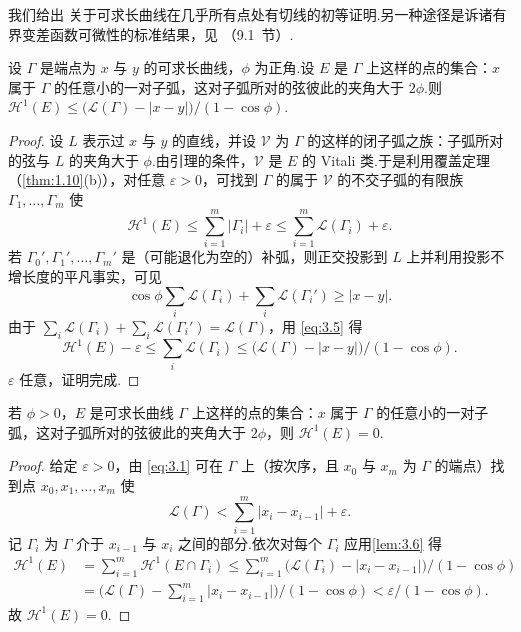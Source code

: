 我们给出 \textcite{besicovitch1944} 关于可求长曲线在几乎所有点处有切线的初等证明.另一种途径是诉诸有界变差函数可微性的标准结果，见 \textcite{kingmantaylor1966}（9.1~节）.

\begin{lemma}\label{lem:3.6}
设 $\Gamma$ 是端点为 $x$ 与 $y$ 的可求长曲线，$\phi$ 为正角.设 $E$ 是 $\Gamma$ 上这样的点的集合：$x$ 属于 $\Gamma$ 的任意小的一对子弧，这对子弧所对的弦彼此的夹角大于 $2\phi$.则 $\mathcal{H}^1(E)\leq\bigl(\mathscr{L}(\Gamma)-|x-y|\bigr)/(1-\cos\phi)$.
\end{lemma}

\begin{proof}
设 $L$ 表示过 $x$ 与 $y$ 的直线，并设 $\mathcal{V}$ 为 $\Gamma$ 的这样的闭子弧之族：子弧所对的弦与 $L$ 的夹角大于 $\phi$.由引理的条件，$\mathcal{V}$ 是 $E$ 的 Vitali 类.于是利用覆盖定理（\cref{thm:1.10}(b)），对任意 $\varepsilon>0$，可找到 $\Gamma$ 的属于 $\mathcal{V}$ 的不交子弧的有限族 $\Gamma_1,\ldots,\Gamma_m$ 使
\begin{equation}\label{eq:3.5}
  \mathcal{H}^{1}(E)\leq\sum_{i=1}^{m}|\Gamma_i|+\varepsilon\leq\sum_{i=1}^{m}\mathscr{L}(\Gamma_i)+\varepsilon.
\end{equation}
若 $\Gamma_0',\Gamma_1',\ldots,\Gamma_m'$ 是（可能退化为空的）补弧，则正交投影到 $L$ 上并利用投影不增长度的平凡事实，可见
\[
  \cos\phi\sum_{i}\mathscr{L}(\Gamma_i)+\sum_{i}\mathscr{L}(\Gamma_i')\geq|x-y|.
\]
由于 $\sum_{i}\mathscr{L}(\Gamma_i)+\sum_{i}\mathscr{L}(\Gamma_i')=\mathscr{L}(\Gamma)$，用 \eqref{eq:3.5} 得
\[
  \mathcal{H}^{1}(E)-\varepsilon\leq\sum_{i}\mathscr{L}(\Gamma_i)\leq\bigl(\mathscr{L}(\Gamma)-|x-y|\bigr)/(1-\cos\phi).
\]
$\varepsilon$ 任意，证明完成.
\end{proof}

\begin{corollary}\label{cor:3.7}
若 $\phi>0$，$E$ 是可求长曲线 $\Gamma$ 上这样的点的集合：$x$ 属于 $\Gamma$ 的任意小的一对子弧，这对子弧所对的弦彼此的夹角大于 $2\phi$，则 $\mathcal{H}^1(E)=0$.
\end{corollary}

\begin{proof}
给定 $\varepsilon>0$，由 \eqref{eq:3.1} 可在 $\Gamma$ 上（按次序，且 $x_0$ 与 $x_m$ 为 $\Gamma$ 的端点）找到点 $x_0,x_1,\ldots,x_m$ 使
\[
  \mathscr{L}(\Gamma)<\sum_{i=1}^{m}|x_i-x_{i-1}|+\varepsilon.
\]
记 $\Gamma_i$ 为 $\Gamma$ 介于 $x_{i-1}$ 与 $x_i$ 之间的部分.依次对每个 $\Gamma_i$ 应用\cref{lem:3.6} 得
\begin{align*}
  \mathcal{H}^{1}(E)
  &=\sum_{i=1}^{m}\mathcal{H}^{1}(E\cap\Gamma_i)
  \leq\sum_{i=1}^{m}\bigl(\mathscr{L}(\Gamma_i)-|x_i-x_{i-1}|\bigr)/(1-\cos\phi)\\
  &=\bigl(\mathscr{L}(\Gamma)-\sum_{i=1}^{m}|x_i-x_{i-1}|\bigr)/(1-\cos\phi)
  <\varepsilon/(1-\cos\phi).
\end{align*}
故 $\mathcal{H}^1(E)=0$.
\end{proof}

